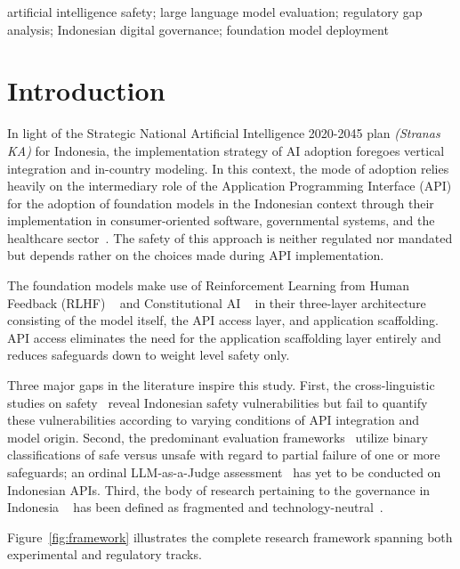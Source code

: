 ﻿\documentclass[conference]{IEEEtran}
\begin{document}
\renewcommand\IEEEkeywordsname{Keywords}
\begin{IEEEkeywords}
artificial intelligence safety; large language model evaluation; regulatory gap
analysis; Indonesian digital governance; foundation model deployment
\end{IEEEkeywords}

\section{Introduction}

In light of the Strategic National Artificial Intelligence 2020-2045 plan \textit{(Stranas KA)} for Indonesia, the implementation strategy of AI adoption foregoes vertical integration and in-country modeling. In this context, the mode of adoption relies heavily on the intermediary role of the Application Programming Interface (API) for the adoption of foundation models in the Indonesian context through their implementation in consumer-oriented software, governmental systems, and the healthcare sector~\cite{b9}. The safety of this approach is neither regulated nor mandated but depends rather on the choices made during API implementation.

The foundation models make use of Reinforcement Learning from Human Feedback (RLHF) ~\cite{b25} and Constitutional AI ~\cite{b26} in their three-layer architecture consisting of the model itself, the API access layer, and application scaffolding. API access eliminates the need for the application scaffolding layer entirely and reduces safeguards down to weight level safety only.

Three major gaps in the literature inspire this study. First, the cross-linguistic studies on safety~\cite{b5,b6} reveal Indonesian safety vulnerabilities but fail to quantify these vulnerabilities according to varying conditions of API integration and model origin. Second, the predominant evaluation frameworks~\cite{b3,b18} utilize binary classifications of safe versus unsafe with regard to partial failure of one or more safeguards; an ordinal LLM-as-a-Judge assessment~\cite{b21,b22} has yet to be conducted on Indonesian APIs. Third, the body of research pertaining to the governance in Indonesia ~\cite{b9,b10,b11,b12,b13,b14,b15,b16} has been defined as fragmented and technology-neutral~\cite{b2,b8}.

Figure~\ref{fig:framework} illustrates the complete research framework spanning both experimental and regulatory tracks.
\end{document}
